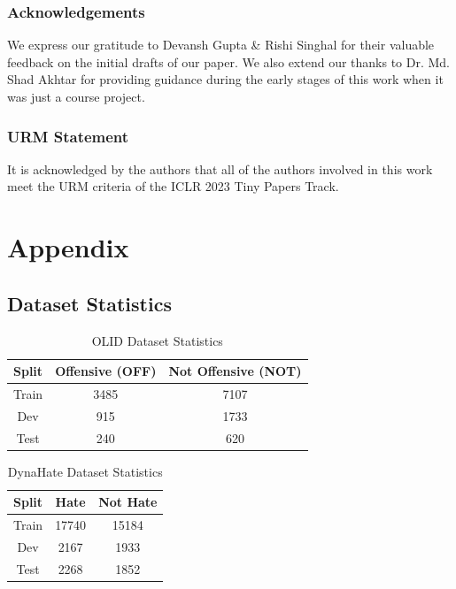 \documentclass{article} %
\begin{document}

\subsubsection*{Acknowledgements}
We express our gratitude to Devansh Gupta \& Rishi Singhal for their valuable feedback on the initial drafts of our paper. We also extend our thanks to Dr. Md. Shad Akhtar for providing guidance during the early stages of this work when it was just a course project.

\subsubsection*{URM Statement}
It is acknowledged by the authors that all of the authors involved in this work meet the URM criteria of the ICLR 2023 Tiny Papers Track.




\appendix
\section{Appendix}

\subsection{Dataset Statistics}
\label{dataset-statistics}

\begin{table}[h]
\begin{center}
\begin{tabular}{||c c c||} 
 \hline
 Split & Offensive (OFF) & Not Offensive (NOT) \\  [0.5ex]
 \hline\hline
Train & 3485 & 7107 \\ 
 \hline
 Dev & 915 & 1733 \\
 \hline
 Test & 240 & 620 \\
 \hline
\end{tabular}
\end{center}
\caption{OLID Dataset Statistics}
\end{table}

\begin{table}[h]
\begin{center}
\begin{tabular}{||c c c||} 
 \hline
 Split & Hate & Not Hate \\  [0.5ex]
 \hline\hline
Train & 17740 & 15184 \\ 
 \hline
 Dev & 2167 & 1933 \\
 \hline
 Test & 2268 & 1852 \\
 \hline
\end{tabular}
\end{center}
\caption{DynaHate Dataset Statistics}
\end{table}
\end{document}
